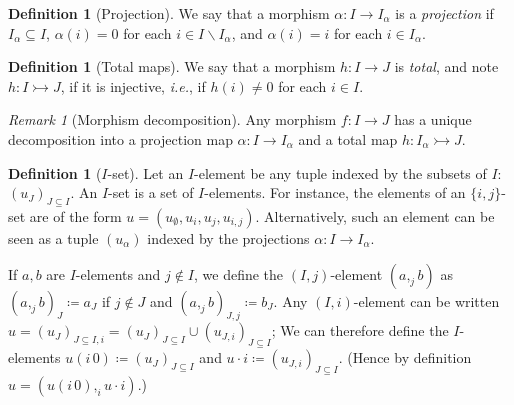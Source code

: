 \documentclass[english]{PaperTools/latex/entcs}
\theoremstyle{plain}
\theoremstyle{definition}
\newtheorem{definition}[theorem]{Definition}
\theoremstyle{remark}
\newtheorem*{remark}{Remark}
\def\ie{\textit{i.e.}}
\begin{document}
\begin{definition}[Projection]
   We say that a morphism $α : I → I_α$ is a \emph{projection} if
   $I_α ⊆ I$,
   $α(i) = 0$ for each $i ∈ I \backslash I_α$, and
   $α(i) = i$ for each $i ∈ I_α$.
\end{definition}
\begin{definition}[Total maps]
   We say that a morphism $h : I → J$ is \emph{total}, and note $h : I ↣ J$,
   if it is injective, \ie, if $h(i) ≠ 0$ for each $i ∈ I$.
\end{definition}
\begin{remark}[Morphism decomposition]
  Any morphism $f : I → J$ has a
  unique decomposition into a projection map
  $α : I → I_α$ and a total map $h : I_α ↣ J$.
%
\end{remark}

\begin{definition}[$I$-set]
  Let an $I$-element be any tuple indexed by the subsets of $I$: $(u_J)_{J ⊆ I}$.
  An $I$-set is a set of $I$-elements.  For instance, the elements of an
  $\{i,j\}$-set are of the form $u = (u_∅,u_i,u_j,u_{i,j})$.
  Alternatively, such an element can be seen as a tuple $(u_α)$ indexed
  by the projections $α : I → I_α$.
\end{definition}
  If $a,b$ are $I$-elements and $j ∉ I$, we define the $(I,j)$-element
  $(a ,_j b)$ as $(a ,_j b)_J ≔ a_J$ if $j ∉ J$ and $(a ,_j b)_{J,j} ≔ b_J$.
  Any $(I,i)$-element can be written $u = (u_J)_{J ⊆ I,i} = (u_J)_{J ⊆ I} ∪ (u_{J,i})_{J ⊆ I}$;
  We can therefore define the $I$-elements $u (i\,0) ≔ (u_J)_{J ⊆ I}$ and
  $u · i ≔ (u_{J,i})_{J ⊆ I}$.
  (Hence by definition $u = (u (i\,0) ,_i u · i)$.)
\end{document}
